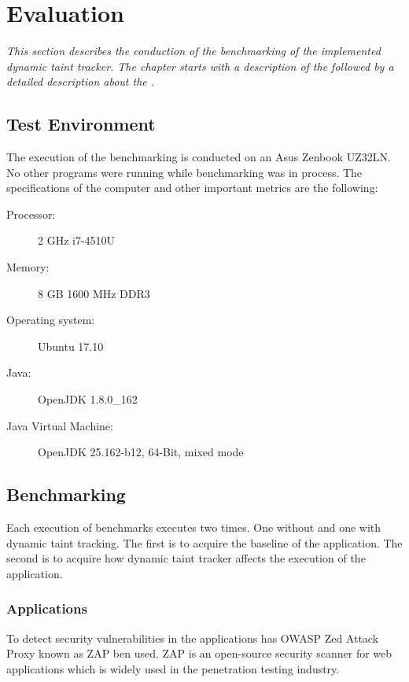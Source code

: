 \chapter{Evaluation}
\label{Evaluation}

\textit{This section describes the conduction of the benchmarking of the implemented dynamic taint tracker. The chapter starts with a description of the \textit{} followed by a detailed description about the \textit{}.}



\section{Test Environment}
\label{TestEnvironment}
The execution of the benchmarking is conducted on an Asus Zenbook UZ32LN. No other programs were running while benchmarking was in process. The specifications of the computer and other important metrics are the following:

\begin{description}
    \item [Processor:] 2 GHz i7-4510U
    \item [Memory:] 8 GB 1600 MHz DDR3
    \item [Operating system:] Ubuntu 17.10
    \item [Java:] OpenJDK 1.8.0\_162
    \item [Java Virtual Machine:] OpenJDK 25.162-b12, 64-Bit, mixed mode
\end{description}



\section{Benchmarking}
\label{Benchmarking}
Each execution of benchmarks executes two times. One without and one with dynamic taint tracking. The first is to acquire the baseline of the application. The second is to acquire how dynamic taint tracker affects the execution of the application.



\subsection{Applications}
To detect security vulnerabilities in the applications has OWASP Zed Attack Proxy \parencite{zap} known as ZAP ben used. ZAP is an open-source security scanner for web applications which is widely used in the penetration testing industry.

